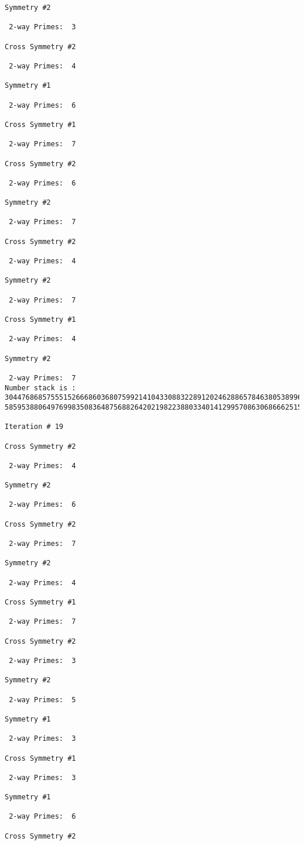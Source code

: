 \begin{verbatim}
Symmetry #2

 2-way Primes: 	3

Cross Symmetry #2

 2-way Primes: 	4

Symmetry #1

 2-way Primes: 	6

Cross Symmetry #1

 2-way Primes: 	7

Cross Symmetry #2

 2-way Primes: 	6

Symmetry #2

 2-way Primes: 	7

Cross Symmetry #2

 2-way Primes: 	4

Symmetry #2

 2-way Primes: 	7

Cross Symmetry #1

 2-way Primes: 	4

Symmetry #2

 2-way Primes: 	7
Number stack is :
30447686857555152666860368075992141043308832289120246288657846380538996794608835958544046240163340857
58595388064976998350836487568826420219822388033401412995708630686662515557586867440375804336104264044

Iteration #	19

Cross Symmetry #2

 2-way Primes: 	4

Symmetry #2

 2-way Primes: 	6

Cross Symmetry #2

 2-way Primes: 	7

Symmetry #2

 2-way Primes: 	4

Cross Symmetry #1

 2-way Primes: 	7

Cross Symmetry #2

 2-way Primes: 	3

Symmetry #2

 2-way Primes: 	5

Symmetry #1

 2-way Primes: 	3

Cross Symmetry #1

 2-way Primes: 	3

Symmetry #1

 2-way Primes: 	6

Cross Symmetry #2


\end{verbatim}
